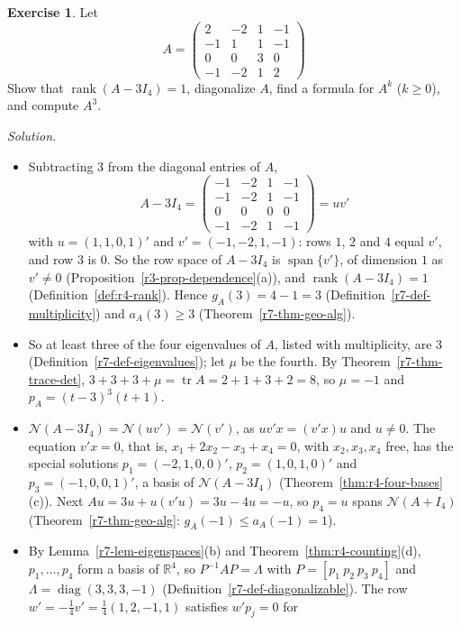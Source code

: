 \documentclass[12pt]{article}
\newcommand{\R}{\mathbb R}
\DeclareMathOperator{\tr}{tr}
\DeclareMathOperator{\diag}{diag}
\DeclareMathOperator{\rank}{rank}
\DeclareMathOperator{\Span}{span}
\theoremstyle{definition}
\newtheorem{exercise}{Exercise}
\newenvironment{solution}{\par\noindent\textit{Solution.}\ }{\par\smallskip}
\begin{document}
\begin{exercise}\label{r7-ex-diagonalize}
Let
\[
A=\begin{pmatrix}2&-2&1&-1\\-1&1&1&-1\\0&0&3&0\\-1&-2&1&2\end{pmatrix}
\]
Show that \(\rank(A-3I_4)=1\), diagonalize \(A\), find a formula for \(A^k\) (\(k\geqslant0\)), and compute \(A^3\).
\end{exercise}
\begin{solution}
\begin{itemize}
\item Subtracting \(3\) from the diagonal entries of \(A\),
\[
A-3I_4=\begin{pmatrix}-1&-2&1&-1\\-1&-2&1&-1\\0&0&0&0\\-1&-2&1&-1\end{pmatrix}=uv'
\]
with \(u=(1,1,0,1)'\) and \(v'=(-1,-2,1,-1)\): rows \(1\), \(2\) and \(4\) equal \(v'\), and row
\(3\) is \(0\). So the row space of \(A-3I_4\) is \(\Span\{v'\}\), of dimension \(1\) as \(v'\ne0\)
(Proposition~\ref{r3-prop-dependence}(a)), and \(\rank(A-3I_4)=1\) (Definition~\ref{def:r4-rank}). Hence
\(g_A(3)=4-1=3\) (Definition~\ref{r7-def-multiplicity}) and \(a_A(3)\geqslant3\) (Theorem~\ref{r7-thm-geo-alg}).
\item So at least three of the four eigenvalues of \(A\), listed with multiplicity, are \(3\)
(Definition~\ref{r7-def-eigenvalues}); let \(\mu\) be the fourth. By Theorem~\ref{r7-thm-trace-det},
\(3+3+3+\mu=\tr A=2+1+3+2=8\), so \(\mu=-1\) and \(p_A=(t-3)^3(t+1)\).
\item \(\mathcal N(A-3I_4)=\mathcal N(uv')=\mathcal N(v')\), as \(uv'x=(v'x)u\) and \(u\ne0\). The equation \(v'x=0\), that
is, \(x_1+2x_2-x_3+x_4=0\), with \(x_2,x_3,x_4\) free, has the special solutions \(p_1=(-2,1,0,0)'\),
\(p_2=(1,0,1,0)'\) and \(p_3=(-1,0,0,1)'\), a basis of \(\mathcal N(A-3I_4)\) (Theorem~\ref{thm:r4-four-bases}(c)).
Next \(Au=3u+u(v'u)=3u-4u=-u\), so \(p_4=u\) spans \(\mathcal N(A+I_4)\) (Theorem~\ref{r7-thm-geo-alg}:
\(g_A(-1)\leqslant a_A(-1)=1\)).
\item By Lemma~\ref{r7-lem-eigenspaces}(b) and Theorem~\ref{thm:r4-counting}(d), \(p_1,\dots,p_4\) form a basis of
\(\R^4\), so \(P^{-1}AP=\Lambda\) with \(P=[p_1\ p_2\ p_3\ p_4]\) and \(\Lambda=\diag(3,3,3,-1)\)
(Definition~\ref{r7-def-diagonalizable}). The row \(w'=-\frac14v'=\frac14(1,2,-1,1)\) satisfies \(w'p_j=0\) for

\end{itemize}
\end{solution}
\end{document}
